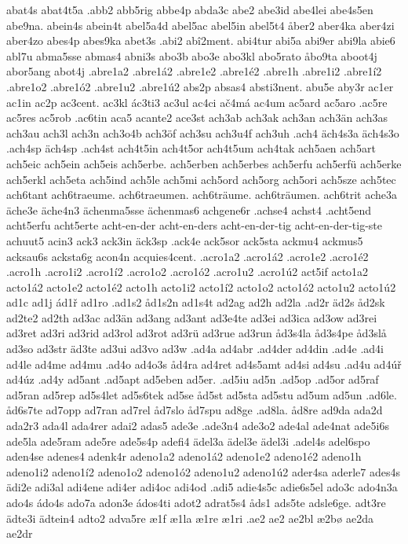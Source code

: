 abat4s
abat4t5a
.abb2
abb5rig
abbe4p
abda3c
abe2
abe3id
abe4lei
abe4s5en
abe9na.
abein4s
abein4t
abel5a4d
abel5ac
abel5in
abel5t4
åber2
aber4ka
aber4zi
aber4zo
abes4p
abes9ka
abet3s
.abi2
abî2ment.
abi4tur
abi5a
abi9er
abi9la
abie6
abl7u
abma5sse
abmas4
abni3s
abo3b
abo3e
abo3kl
abo5rato
åbo9ta
aboot4j
abor5ang
abot4j
.abre1a2
.abre1á2
.abre1e2
.abre1é2
.abre1h
.abre1i2
.abre1í2
.abre1o2
.abre1ó2
.abre1u2
.abre1ú2
abs2p
absas4
absti3nent.
abu5e
aby3r
ac1er
ac1in
ac2p
ac3cent.
ac3kl
ác3ti3
ac3ul
ac4ci
ač4má
ac4um
ac5ard
ac5aro
.ac5re
ac5res
ac5rob
.ac6tin
aca5
acante2
ace3st
ach3ab
ach3ak
ach3an
ach3än
ach3as
ach3au
ach3l
ach3n
ach3o4b
ach3öf
ach3su
ach3u4f
ach3uh
.ach4
äch4s3a
äch4s3o
.ach4sp
äch4sp
.ach4st
ach4t5in
ach4t5or
ach4t5um
ach4tak
ach5aen
ach5art
ach5eic
ach5ein
ach5eis
ach5erbe.
ach5erben
ach5erbes
ach5erfu
ach5erfü
ach5erke
ach5erkl
ach5eta
ach5ind
ach5le
ach5mi
ach5ord
ach5org
ach5ori
ach5sze
ach5tec
ach6tant
ach6traeume.
ach6traeumen.
ach6träume.
ach6träumen.
ach6trit
ache3a
äche3e
äche4n3
ächenma5sse
ächenmas6
achgene6r
.achse4
achst4
.acht5end
acht5erfu
acht5erte
acht-en-der
acht-en-ders
acht-en-der-tig
acht-en-der-tig-ste
achuut5
acin3
ack3
ack3in
äck3sp
.ack4e
ack5sor
ack5sta
ackmu4
ackmus5
acksau6s
acksta6g
acon4n
acquies4cent.
.acro1a2
.acro1á2
.acro1e2
.acro1é2
.acro1h
.acro1i2
.acro1í2
.acro1o2
.acro1ó2
.acro1u2
.acro1ú2
act5if
acto1a2
acto1á2
acto1e2
acto1é2
acto1h
acto1i2
acto1í2
acto1o2
acto1ó2
acto1u2
acto1ú2
ad1c
ad1j
ád1ř
ad1ro
.ad1s2
åd1s2n
ad1s4t
ad2ag
ad2h
ad2la
.ad2r
äd2s
åd2sk
ad2te2
ad2th
ad3ac
ad3än
ad3ang
ad3ant
ad3e4te
ad3ei
ad3ica
ad3ow
ad3rei
ad3ret
ad3ri
ad3rid
ad3rol
ad3rot
ad3rü
ad3rue
ad3run
åd3s4la
åd3s4pe
åd3slå
ad3so
ad3str
äd3te
ad3ui
ad3vo
ad3w
.ad4a
ad4abr
.ad4der
ad4din
.ad4e
.ad4i
ad4le
ad4me
ad4mu
.ad4o
ad4o3s
åd4ra
ad4ret
ad4s5amt
ad4si
ad4su
.ad4u
ad4úř
ad4úz
.ad4y
ad5ant
.ad5apt
ad5eben
ad5er.
.ad5iu
ad5n
.ad5op
.ad5or
ad5raf
ad5ran
ad5rep
ad5s4let
ad5s6tek
ad5se
åd5st
ad5sta
ad5stu
ad5um
ad5un
.ad6le.
åd6s7te
ad7opp
ad7ran
ad7rel
åd7slo
åd7spu
ad8ge
.ad8la.
åd8re
ad9da
ada2d
ada2r3
ada4l
ada4rer
adai2
adas5
ade3e
.ade3n4
ade3o2
ade4al
ade4nat
ade5i6s
ade5la
ade5ram
ade5re
ade5s4p
adefi4
ädel3a
ädel3e
ädel3i
.adel4s
adel6spo
aden4se
adenes4
adenk4r
adeno1a2
adeno1á2
adeno1e2
adeno1é2
adeno1h
adeno1i2
adeno1í2
adeno1o2
adeno1ó2
adeno1u2
adeno1ú2
ader4sa
aderle7
ades4s
ädi2e
adi3al
adi4ene
adi4er
adi4oc
adi4od
.adi5
adie4s5c
adie6s5el
ado3c
ado4n3a
ado4s
ádo4s
ado7a
adon3e
ádos4ti
adot2
adrat5s4
åds1
ads5te
adsle6ge.
adt3re
ädte3i
ädtein4
adto2
adva5re
æ1f
æ1la
æ1re
æ1ri
.ae2
ae2
ae2bl
æ2bø
ae2da
ae2dr
